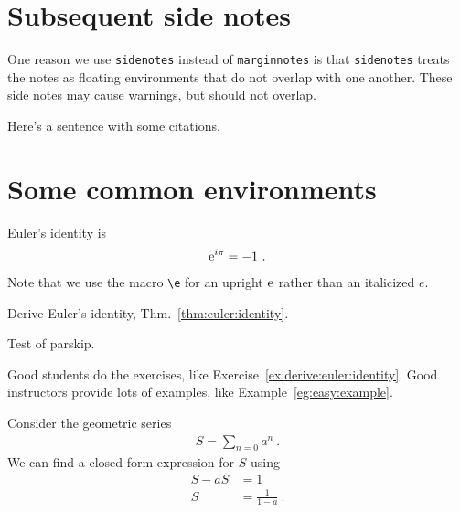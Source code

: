 \section{Subsequent side notes}

One reason we use \texttt{sidenotes} instead of \texttt{marginnotes} is that \texttt{sidenotes} treats the notes as floating environments that do not overlap with one another. These side notes may cause warnings, but should not overlap.

Here's a sentence with some citations.



\section{Some common environments}

\begin{theorem}
\label{thm:euler:identity}
    Euler's identity is
    \begin{align}
        \operatorname{e}^{i\pi} = -1 \ .
    \end{align}
    Note that we use the macro \verb!\e! for an upright $\operatorname{e}$ rather than an italicized $e$.
\end{theorem}

\begin{exercise}
\label{ex:derive:euler:identity}
    Derive Euler's identity, Thm.~\ref{thm:euler:identity}.

    Test of parskip.
\end{exercise}

\noindent Good students do the exercises, like Exercise~\ref{ex:derive:euler:identity}. Good instructors provide lots of examples, like Example~\ref{eg:easy:example}.

\begin{example}
\label{eg:easy:example}
    Consider the geometric series
    \begin{align}
        S = \sum_{n=0} a^n \ .
    \end{align}
    We can find a closed form expression for $S$ using
    \begin{align}
        S - aS &= 1\\
        S &= \frac{1}{1-a} \ .
    \end{align}
\end{example}

